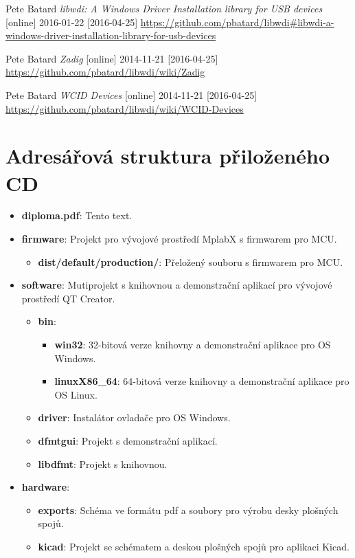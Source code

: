 \documentclass[czech,master,public,dept460,male,cpdeclaration]{diploma}	%
\begin{document}
\begin{thebibliography}{99}
 Pete Batard
\textit{libwdi: A Windows Driver Installation library for USB devices} [online] 2016-01-22 [2016-04-25]
\url{https://github.com/pbatard/libwdi#libwdi-a-windows-driver-installation-library-for-usb-devices}

 Pete Batard
\textit{Zadig} [online] 2014-11-21 [2016-04-25]
\url{https://github.com/pbatard/libwdi/wiki/Zadig}

 Pete Batard
\textit{WCID Devices} [online] 2014-11-21 [2016-04-25]
\url{https://github.com/pbatard/libwdi/wiki/WCID-Devices}

\end{thebibliography}




\appendix

\section{Adresářová struktura  přiloženého CD}
\label{sec:ap-cd}

\begin{itemize}
\item \textbf{diploma.pdf}: Tento text.

\item \textbf{firmware}: Projekt pro vývojové prostředí MplabX s firmwarem pro MCU.
	\begin{itemize}
	\item \textbf{dist/default/production/}: Přeložený souboru s firmwarem pro MCU.
	\end{itemize}

\item \textbf{software}: Mutiprojekt s knihovnou a demonstrační aplikací pro vývojové prostředí QT Creator.
	\begin{itemize}
	\item \textbf{bin}:
		\begin{itemize}
		\item \textbf{win32}: 32-bitová verze knihovny a demonstrační aplikace pro OS Windows.
		\item \textbf{linuxX86\_64}: 64-bitová verze knihovny a demonstrační aplikace pro OS Linux.
		\end{itemize}
	\item \textbf{driver}: Instalátor ovladače pro OS Windows.
	\item \textbf{dfmtgui}: Projekt s demonstrační aplikací.
	\item \textbf{libdfmt}: Projekt s knihovnou.
	\end{itemize}
	
\item \textbf{hardware}:
	\begin{itemize}
	\item \textbf{exports}: Schéma ve formátu pdf a soubory pro výrobu desky plošných spojů.
	\item \textbf{kicad}: Projekt se schématem a deskou plošných spojů pro aplikaci Kicad.
	\end{itemize}



\end{itemize}
\end{document}
